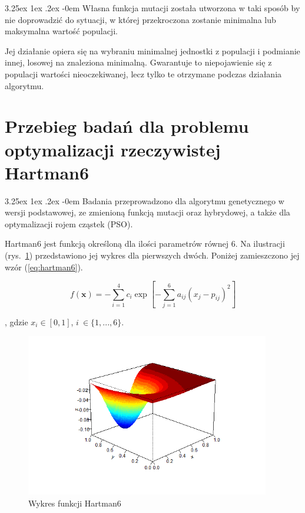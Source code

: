 \documentclass[11pt, a4paper]{article}
\makeatletter
\newcommand{\fbi}{\leavevmode{\parindent=1em\indent}}
\renewcommand\paragraph{\@startsection{paragraph}{5}{\z@}
  {3.25ex \@plus1ex \@minus.2ex}
  {-0em}
  {\normalfont\normalsize\bfseries}}
\makeatother
\begin{document}
\paragraph{}
Własna funkcja mutacji została utworzona w taki sposób by nie doprowadzić do sytuacji, w której przekroczona zostanie minimalna lub maksymalna wartość populacji. 

\fbi
Jej działanie opiera się na wybraniu minimalnej jednostki z populacji i podmianie innej, losowej na znaleziona minimalną. Gwarantuje to niepojawienie się z populacji wartości nieoczekiwanej, lecz tylko te otrzymane podczas działania algorytmu.


\newpage
\section{Przebieg badań dla problemu optymalizacji rzeczywistej Hartman6}
\paragraph{}
Badania przeprowadzono dla algorytmu genetycznego w wersji podstawowej, ze zmienioną funkcją mutacji oraz hybrydowej, a także dla optymalizacji rojem cząstek (PSO).

\fbi
Hartman6 jest funkcją określoną dla ilości parametrów równej 6. Na ilustracji (rys.~\ref{fig:Hartman6_overview}) przedstawiono jej wykres dla pierwszych dwóch. Poniżej zamieszczono jej wzór (\ref{eq:hartman6}).

\begin{equation}\label{eq:hartman6}
f(\boldsymbol{x}) = - \sum_{i=1}^{4} c_i \exp[- \sum_{j=1}^{6} a_{ij}(x_j - p_{ij})^2]
\end{equation}

, gdzie $ x_i \in [0, 1] $, $ i~\in \{1, ..., 6\} $.


\begin{figure}[H]
	\centering
	\includegraphics[width=0.95\textwidth]{./assets/Hartman6_overview.png}
	\caption{Wykres funkcji Hartman6}
	\label{fig:Hartman6_overview}
\end{figure}
\end{document}
